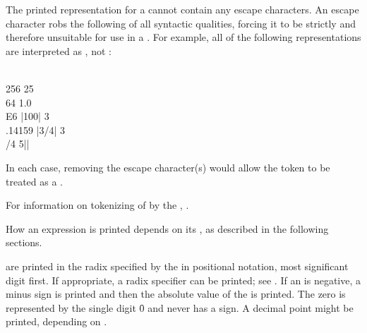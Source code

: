
\endsubsection%



The printed representation for a  cannot contain any escape characters.
An escape character robs the following  of all syntactic
qualities, forcing it to be strictly  and therefore unsuitable
for use in a .  For example,
all of the following representations are interpreted as 
, not :

\code
 \\256   25\\64   1.0\\E6   |100|   3\\.14159   |3/4|   3\\/4   5||
\endcode

In each case, removing the escape character(s) would allow the token
to be treated as a .

For information on tokenizing of  by the ,
\seesection\PotentialNumbersAsTokens.

\endsubsection%


How an expression is printed depends on its , as described
in the following sections.


 are printed in the radix specified by the 
in positional notation, most significant digit first.
If appropriate, a radix specifier can be printed; see .
If an  is negative, a minus sign is printed and then the
absolute value of the  is printed.
The  zero is represented
by the single digit \f{0} and never has a sign.
A decimal point might be printed, 
depending on .

